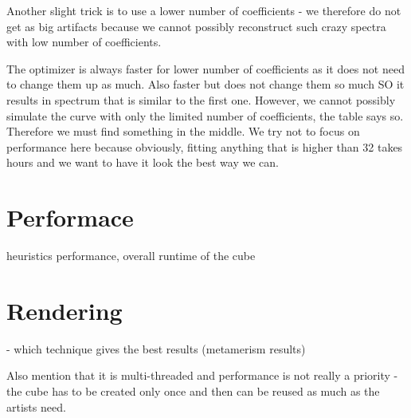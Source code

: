 Another slight trick is to use a lower number of coefficients - we therefore do not get as big artifacts because we cannot possibly reconstruct such crazy spectra with low number of coefficients. 

The optimizer is always faster for lower number of coefficients as it does not need to change them up as much. Also faster but does not change them so much SO it results in spectrum that is similar to the first one. However, we cannot possibly simulate the curve with only the limited number of coefficients, the table says so. Therefore we must find something in the middle. We try not to focus on performance here because obviously, fitting anything that is higher than 32 takes hours and we want to have it look the best way we can.

\section{Performace}

heuristics performance, overall runtime of the cube

\section{Rendering}

- which technique gives the best results (metamerism results)


Also mention that it is multi-threaded and performance is not really a priority - the cube has to be created only once and then can be reused as much as the artists need.
